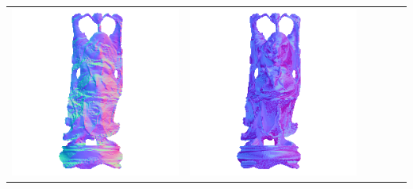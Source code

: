 \begin{tabularx}{\linewidth}{@{}Y@{}Y@{}Y@{}Y@{}Y@{}Y@{}}
\includegraphics[width=\linewidth]{semisynthetic/20160617_20_yu_out.png} &
\includegraphics[width=\linewidth]{semisynthetic/20160617_20_dpsn_out.png} &

\end{tabularx}
